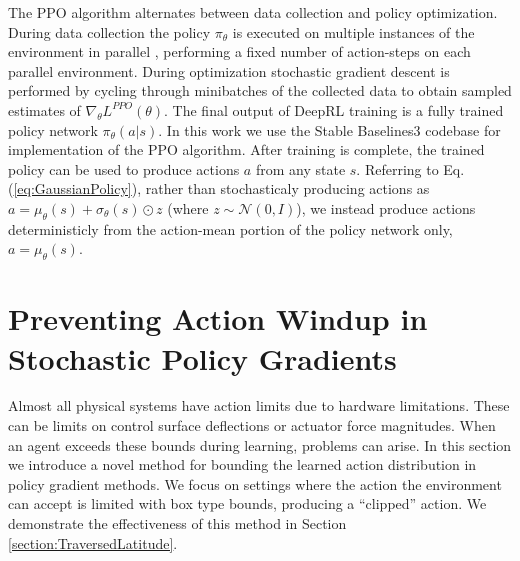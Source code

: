 \documentclass{UnderReview}
\begin{document}
The PPO algorithm alternates between data collection and policy optimization.  During data collection the policy $\pi_\theta$ is executed on multiple instances of the environment in parallel \cite{mnih2016asynchronous, schulman2017proximal}, performing a fixed number of action-steps on each parallel environment.  During optimization stochastic gradient descent is performed by cycling through minibatches of the collected data to obtain sampled estimates of $\nabla_\theta L^{PPO}(\theta)$.  The final output of DeepRL training is a fully trained policy network $\pi_\theta(a|s)$.  In this work we use the Stable Baselines3 codebase \cite{stable-baselines3} for implementation of the PPO algorithm. After training is complete, the trained policy can be used to produce actions $a$ from any state $s$.  Referring to Eq. (\ref{eq:GaussianPolicy}), rather than stochasticaly producing actions as $a = \mu_\theta(s) + \sigma_\theta(s) \odot z$ (where $z \sim \mathcal{N}(0,I)$), we instead produce actions deterministicly from the action-mean portion of the policy network only, $a=\mu_\theta(s)$.


\section{Preventing Action Windup in Stochastic Policy Gradients}
Almost all physical systems have action limits due to hardware limitations.  These can be limits on control surface deflections or actuator force magnitudes.  When an agent exceeds these bounds during learning, problems can arise.  In this section we introduce a novel method for bounding the learned action distribution in policy gradient methods.  We focus on settings where the action the environment can accept is limited with box type bounds, producing a ``clipped'' action.  We demonstrate the effectiveness of this method in Section \ref{section:TraversedLatitude}.
\end{document}
